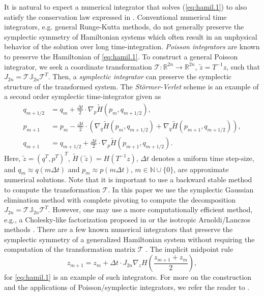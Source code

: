 It is natural to expect a numerical integrator that solves (\ref{eq:hamil.1}) to also satisfy the conservation law expressed in  . Conventional numerical time integrators, e.g. general Runge-Kutta methods, do not generally preserve the symplectic symmetry of Hamiltonian systems which often result in an unphysical behavior of the solution over long time-integration. \emph{Poisson integrators} \cite{Hairer:1250576} are known to preserve the Hamiltonian of \eqref{eq:hamil.1}. To construct a general Poisson integrator, we seek a coordinate transformation $\mathcal T:\mathbb R^{2n}\to\mathbb R^{2n}$, $\tilde z = T^{-1}z$, such that $J_{2n} = \mathcal T \mathbb J_{2n} \mathcal T^T$. Then, a \emph{symplectic integrator} can preserve the symplectic structure of the transformed system. The \emph{St\"ormer-Verlet} scheme is an example of a second order symplectic time-integrator given as
\begin{equation} \label{eq:hamil.6}
	\begin{aligned}
	q_{m+1/2} &= q_m + \frac{\Delta t} 2 \cdot \nabla_p \tilde H(p_m,q_{m+1/2}), \\
	p_{m+1} &= p_m - \frac{\Delta t} 2  \cdot \left( \nabla_q \tilde H(p_m,q_{m+1/2}) + \nabla_{q} \tilde H(p_{m+1},q_{m+1/2}) \right), \\
	q_{m+1} &= q_{m+1/2} + \frac{\Delta t} 2  \cdot  \nabla_p \tilde H(p_{m+1},q_{m+1/2}).
	\end{aligned}
\end{equation}
Here, $\tilde z = (q^T,p^T)^T$, $\tilde H(\tilde z) = H(T^{-1}z)$, $\Delta t$ denotes a uniform time step-size, and $q_m \approx q(m\Delta t)$ and $p_m \approx p(m\Delta t)$, $m \in \mathbb{N} \cup \{ 0\}$, are approximate numerical solutions. Note that it is important to use a backward stable method to compute the transformation $\mathcal T$. In this paper we use the symplectic Gaussian elimination method with complete pivoting to compute the decomposition $J_{2n} = \mathcal T \mathbb J_{2n} \mathcal T^T$. However, one may use a more computationally efficient method, e.g., a Cholesky-like factorization proposed in \cite{benner:chol} or the isotropic Arnoldi/Lanczos methods \cite{doi:10.1137/S1064827500366434}. There are a few known numerical integrators that preserve the symplectic symmetry of a generalized Hamiltonian system without requiring the computation of the transformation matrix $\mathcal T$ \cite{Hairer:1250576}. The implicit midpoint rule
\begin{equation} \label{eq:hamil.7}
	z_{m+1} = z_{m} + \Delta t \cdot J_{2n} \nabla_z H \left( \frac{z_{m+1} + z_m}{2} \right),
\end{equation}
for \cref{eq:hamil.1} is an example of such integrators. For more on the construction and the applications of Poisson/symplectic integrators, we refer the reader to \cite{Hairer:1250576,bhatt2017structure}.
